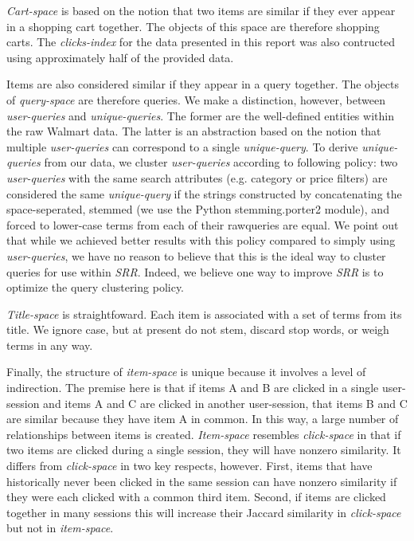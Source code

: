 \documentclass{article}
\begin{document}
{\em Cart-space} is based on the notion that two items are similar if they ever
appear in a shopping cart together. The objects of this space are therefore
shopping carts. The {\em clicks-index} for the data presented in this report was
also contructed using approximately half of the provided data.

Items are also considered similar if they appear in a query together. The
objects of {\em query-space} are therefore queries. We make a distinction,
however, between {\em user-queries} and {\em unique-queries}. The former are the
well-defined entities within the raw Walmart data. The latter is an abstraction
based on the notion that multiple {\em user-queries} can correspond to a single
{\em unique-query}. To derive {\em unique-queries} from our data, we cluster
{\em user-queries} according to following policy: two {\em user-queries} with the same search
attributes (e.g. category or price filters) are considered the same {\em
unique-query} if the strings constructed by concatenating the space-seperated,
stemmed (we use the Python stemming.porter2 module), and forced to lower-case terms
from each of their rawqueries are equal. We point out that while we achieved
better results with this policy compared to simply using {\em user-queries}, we
have no reason to believe that this is the ideal way to cluster queries for use
within {\em SRR}. Indeed, we believe one way to improve {\em SRR} is to optimize 
the query clustering policy.

{\em Title-space} is straightfoward. Each item is associated with a set of terms
from its title. We ignore case, but at present do not stem, discard stop words,
or weigh terms in any way. 

Finally, the structure of {\em item-space} is unique because it involves a level
of indirection. The premise here is that if items A and B are clicked in a
single user-session and items A and C are clicked in another user-session, that
items B and C are similar because they have item A in common. In this way, a
large number of relationships between items is created. {\em Item-space}
resembles {\em click-space} in that if two items are clicked during a single
session, they will have nonzero similarity. It differs from {\em click-space} in
two key respects, however. First, items that have historically never been
clicked in the same session can have nonzero similarity if they were each
clicked with a common third item. Second, if items are clicked together in many
sessions this will increase their Jaccard similarity in {\em click-space} but
not in {\em item-space}.
\end{document}
